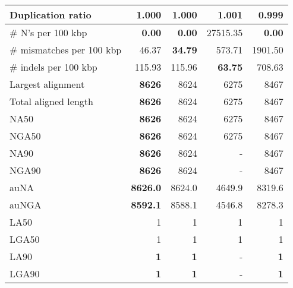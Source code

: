 \documentclass[12pt,a4paper]{article}
\begin{document}
\begin{table}[ht]
\begin{center}
\begin{tabular}{|l*{4}{|r}|}
Duplication ratio & 1.000 & 1.000 & 1.001 & {\bf 0.999} \\ \hline
\# N's per 100 kbp & {\bf 0.00} & {\bf 0.00} & 27515.35 & {\bf 0.00} \\ \hline
\# mismatches per 100 kbp & 46.37 & {\bf 34.79} & 573.71 & 1901.50 \\ \hline
\# indels per 100 kbp & 115.93 & 115.96 & {\bf 63.75} & 708.63 \\ \hline
Largest alignment & {\bf 8626} & 8624 & 6275 & 8467 \\ \hline
Total aligned length & {\bf 8626} & 8624 & 6275 & 8467 \\ \hline
NA50 & {\bf 8626} & 8624 & 6275 & 8467 \\ \hline
NGA50 & {\bf 8626} & 8624 & 6275 & 8467 \\ \hline
NA90 & {\bf 8626} & 8624 & - & 8467 \\ \hline
NGA90 & {\bf 8626} & 8624 & - & 8467 \\ \hline
auNA & {\bf 8626.0} & 8624.0 & 4649.9 & 8319.6 \\ \hline
auNGA & {\bf 8592.1} & 8588.1 & 4546.8 & 8278.3 \\ \hline
LA50 & 1 & 1 & 1 & 1 \\ \hline
LGA50 & 1 & 1 & 1 & 1 \\ \hline
LA90 & {\bf 1} & {\bf 1} & - & {\bf 1} \\ \hline
LGA90 & {\bf 1} & {\bf 1} & - & {\bf 1} \\ \hline
\end{tabular}
\end{center}
\end{table}
\end{document}
